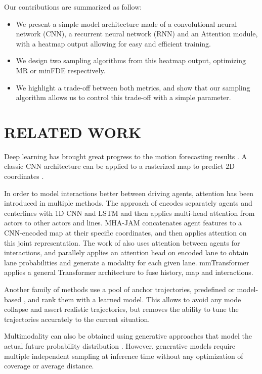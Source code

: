 \documentclass[letterpaper, 10 pt, conference]{ieeeconf}
\begin{document}
Our contributions are summarized as follow:
\begin{itemize}
    \item We present a simple model architecture made of a convolutional neural network (CNN), a recurrent neural network (RNN) and an Attention module, with a heatmap output allowing for easy and efficient training.
    \item We design two  sampling algorithms from this heatmap output, optimizing MR or minFDE respectively.
    \item We highlight a trade-off between both metrics, and show that our sampling algorithm allows us to control this trade-off with a simple parameter.
\end{itemize}




\section{RELATED WORK}

Deep learning has brought great progress to the motion forecasting results \cite{mozaffari2020deep}. A classic CNN architecture can be applied to a rasterized map to predict 2D coordinates \cite{cui2019multimodal}.


In order to model interactions better between driving agents, attention has been introduced in multiple methods. The approach of \cite{mercat2020multi} encodes separately agents and centerlines with 1D CNN and LSTM and then applies multi-head attention from actors to other actors and lines. MHA-JAM \cite{messaoud2020multi} concatenates agent features to a CNN-encoded map at their specific coordinates, and then applies attention on this joint representation. The work of \cite{luo2020probabilistic} also uses attention between agents for interactions, and parallely applies an attention head on encoded lane to obtain lane probabilities and generate a modality for each given lane. mmTransformer \cite{liu2021multimodal} applies a general Transformer \cite{vaswani2017polosukhin} architecture to fuse history, map and interactions.

Another family of methods use a pool of anchor trajectories, predefined \cite{chai2020multipath} or model-based \cite{phan2020covernet,song2021learning}, and rank them with a learned model. This allows to avoid any mode collapse and assert realistic trajectories, but removes the ability to tune the trajectories accurately to the current situation.

Multimodality can also be obtained using generative approaches   that model the actual future probability distribution \cite{lee2017desire, mangalam2020not, tang2019multiple, rhinehart2018r2p2, rhinehart2019precog}. However, generative models require multiple independent sampling at inference time without any optimization of coverage or average distance.
\end{document}
